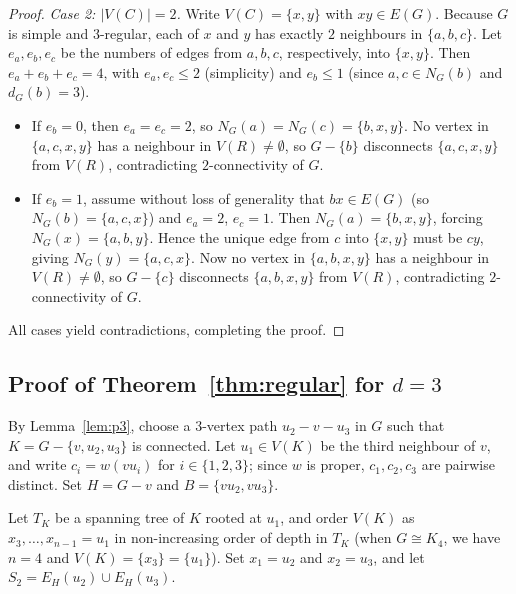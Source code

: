 \documentclass[11pt,a4paper]{article}
\begin{document}
\begin{proof}
\medskip\noindent\textit{Case 2: $|V(C)| = 2$.} Write $V(C) = \{x, y\}$ with $xy \in E(G)$. Because $G$ is simple and $3$-regular, each of $x$ and $y$ has exactly $2$ neighbours in $\{a, b, c\}$. Let $e_a, e_b, e_c$ be the numbers of edges from $a, b, c$, respectively, into $\{x, y\}$. Then $e_a + e_b + e_c = 4$, with $e_a, e_c \le 2$ (simplicity) and $e_b \le 1$ (since $a, c \in N_G(b)$ and $d_G(b) = 3$).
\begin{itemize}
  \item If $e_b = 0$, then $e_a = e_c = 2$, so $N_G(a) = N_G(c) = \{b, x, y\}$. No vertex in $\{a, c, x, y\}$ has a neighbour in $V(R) \neq \emptyset$, so $G - \{b\}$ disconnects $\{a, c, x, y\}$ from $V(R)$, contradicting $2$-connectivity of $G$.
  \item If $e_b = 1$, assume without loss of generality that $bx \in E(G)$ (so $N_G(b) = \{a, c, x\}$) and $e_a = 2$, $e_c = 1$. Then $N_G(a) = \{b, x, y\}$, forcing $N_G(x) = \{a, b, y\}$. Hence the unique edge from $c$ into $\{x, y\}$ must be $cy$, giving $N_G(y) = \{a, c, x\}$. Now no vertex in $\{a, b, x, y\}$ has a neighbour in $V(R) \neq \emptyset$, so $G - \{c\}$ disconnects $\{a, b, x, y\}$ from $V(R)$, contradicting $2$-connectivity of $G$.
\end{itemize}
All cases yield contradictions, completing the proof.
\end{proof}

\subsection{Proof of Theorem~\ref{thm:regular} for $d = 3$}

By Lemma~\ref{lem:p3}, choose a $3$-vertex path $u_2 - v - u_3$ in $G$ such that $K = G - \{v, u_2, u_3\}$ is connected. Let $u_1 \in V(K)$ be the third neighbour of $v$, and write $c_i = w(v u_i)$ for $i \in \{1, 2, 3\}$; since $w$ is proper, $c_1, c_2, c_3$ are pairwise distinct. Set $H = G - v$ and $B = \{v u_2, v u_3\}$.

Let $T_K$ be a spanning tree of $K$ rooted at $u_1$, and order $V(K)$ as $x_3, \dots, x_{n-1} = u_1$ in non-increasing order of depth in $T_K$ (when $G \cong K_4$, we have $n = 4$ and $V(K) = \{x_3\} = \{u_1\}$). Set $x_1 = u_2$ and $x_2 = u_3$, and let $S_2 = E_H(u_2) \cup E_H(u_3)$.
\end{document}
